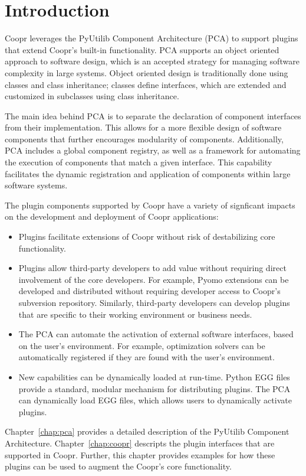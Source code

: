 
\chapter{Introduction}

Coopr leverages the PyUtilib Component Architecture (PCA) to support
plugins that extend Coopr's built-in functionality.  PCA supports an
object oriented approach to software design, which is an accepted strategy
for managing software complexity in large systems.  Object oriented
design is traditionally done using classes and class inheritance;  classes
define interfaces, which are extended and customized in subclasses using
class inheritance.

The main idea behind PCA is to separate the declaration of component
interfaces from their implementation.  This allows for a more flexible
design of software components that further encourages modularity of
components.  Additionally, PCA includes a global component registry, as
well as a framework for automating the execution of components that match
a given interface.  This capability facilitates the dynamic registration
and application of components within large software systems.

The plugin components supported by Coopr have a variety of signficant impacts
on the development and deployment of Coopr applications:
\begin{itemize}

\item Plugins facilitate extensions of Coopr without risk of destabilizing core functionality.  

\item Plugins allow third-party developers to add value without requiring direct involvement of the core developers.  For example, Pyomo extensions can be developed and distributed without requiring developer access to Coopr's subversion repository.  Similarly, third-party developers can develop 
plugins that are specific to their working environment or business needs.

\item The PCA can automate the activation of external software interfaces, based on the user's environment.  For example, optimization solvers can be
automatically registered if they are found with the user's  environment.

\item New capabilities can be dynamically loaded at run-time.  Python EGG files provide a standard, modular mechanism for distributing plugins.  The PCA can dynamically load EGG files, which allows users to dynamically activate 
plugins.

\end{itemize}



Chapter~\ref{chap:pca} provides a detailed description of the PyUtilib
Component Architecture.  Chapter~\ref{chap:coopr} descripts the plugin
interfaces that are supported in Coopr.  Further, this chapter provides
examples for how these plugins can be used to augment the Coopr's core
functionality.


